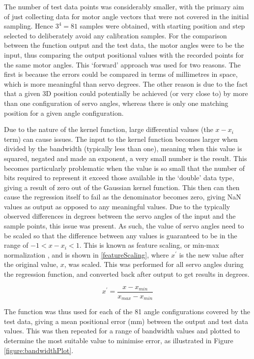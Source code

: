 \documentclass[11pt]{article}
\begin{document}
The number of test data points was considerably smaller, with the primary aim of just collecting data for motor angle vectors that were not covered in the initial sampling. Hence $3^4 = 81$ samples were obtained, with starting position and step selected to deliberately avoid any calibration samples. For the comparison between the function output and the test data, the motor angles were to be the input, thus comparing the output positional values with the recorded points for the same motor angles. This `forward' approach was used for two reasons. The first is because the errors could be compared in terms of millimetres in space, which is more meaningful than servo degrees. The other reason is due to the fact that a given 3D position could potentially be achieved (or very close to) by more than one configuration of servo angles, whereas there is only one matching position for a given angle configuration. 

Due to the nature of the kernel function, large differential values (the $x - x_{i}$ term) can cause issues. The input to the kernel function becomes larger when divided by the bandwidth (typically less than one), meaning when this value is squared, negated and made an exponent, a very small number is the result. This becomes particularly problematic when the value is so small that the number of bits required to represent it exceed those available in the `double' data type, giving a result of zero out of the Gaussian kernel function. This then can then cause the regression itself to fail as the denominator becomes zero, giving NaN values as output as opposed to any meaningful values. Due to the typically observed differences in degrees between the servo angles of the input and the sample points, this issue was present. As such, the value of servo angles need to be scaled so that the difference between any values is guaranteed to be in the range of $-1 < x - x_{i} < 1$. This is known as feature scaling, or min-max normalization \cite{mohamad2013}, and is shown in \eqref{featureScaling}, where $x^{\prime}$ is the new value after the original value, $x$, was scaled. This was performed for all servo angles during the regression function, and converted back after output to get results in degrees.

\begin{equation}\label{featureScaling}
x^{\prime} = \frac{x - x_{min}}{x_{max} - x_{min}}
\end{equation}

The function was thus used for each of the 81 angle configurations covered by the test data, giving a mean positional error (mm) between the output and test data values. This was then repeated for a range of bandwidth values and plotted to determine the most suitable value to minimise error, as illustrated in Figure \ref{figure:bandwidthPlot}.
\end{document}
